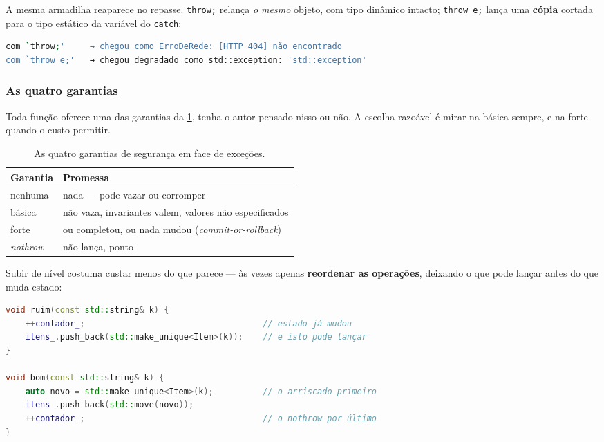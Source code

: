 A mesma armadilha reaparece no repasse. \texttt{throw;} relança \emph{o mesmo}
objeto, com tipo dinâmico intacto; \texttt{throw e;} lança uma \textbf{cópia}
cortada para o tipo estático da variável do \texttt{catch}:

\begin{lstlisting}[style=bt, language=bash,
    caption={Saída de \texttt{src/errors/}: a diferença de um caractere.}]
com `throw;'     → chegou como ErroDeRede: [HTTP 404] não encontrado
com `throw e;'   → chegou degradado como std::exception: 'std::exception'
\end{lstlisting}

\subsubsection{As quatro garantias}

Toda função oferece uma das garantias da \cref{tab:garantias}, tenha o autor
pensado nisso ou não. A escolha razoável é mirar na básica sempre, e na forte
quando o custo permitir.

\begin{table}[htbp]
\centering
\caption{As quatro garantias de segurança em face de exceções.}
\label{tab:garantias}
\footnotesize
\begin{tabular}{@{}ll@{}}
\toprule
\textbf{Garantia} & \textbf{Promessa} \\
\midrule
nenhuma  & nada --- pode vazar ou corromper \\
básica   & não vaza, invariantes valem, valores não especificados \\
forte    & ou completou, ou nada mudou (\emph{commit-or-rollback}) \\
\emph{nothrow} & não lança, ponto \\
\bottomrule
\end{tabular}
\end{table}

Subir de nível costuma custar menos do que parece --- às vezes apenas
\textbf{reordenar as operações}, deixando o que pode lançar antes do que muda
estado:

\begin{lstlisting}[style=bt, language=C++,
    caption={A mesma função, com garantia diferente.}]
void ruim(const std::string& k) {
    ++contador_;                                    // estado já mudou
    itens_.push_back(std::make_unique<Item>(k));    // e isto pode lançar
}

void bom(const std::string& k) {
    auto novo = std::make_unique<Item>(k);          // o arriscado primeiro
    itens_.push_back(std::move(novo));
    ++contador_;                                    // o nothrow por último
}
\end{lstlisting}

